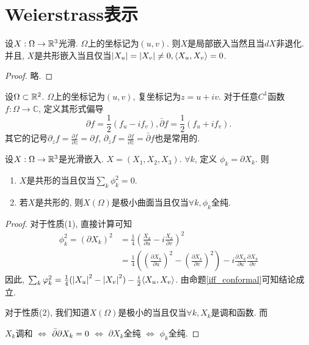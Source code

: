 \section{Weierstrass表示}
\begin{proposition} \label{iff_conformal}
    设$X: \Omega \to \mathbb{R}^3$光滑. $\Omega$上的坐标记为$(u,v)$. 则$X$是局部嵌入当然且当$dX$非退化. 并且, $X$是共形嵌入当且仅当$\left | X_u \right |=\left | X_v \right | \ne 0, {\left < X_u, X_v \right >} =0$.
\end{proposition}
\begin{proof}
    略.
\end{proof}
\begin{definition}
    设$\Omega \subset \mathbb{R}^2$.   $\Omega$上的坐标记为$(u,v)$, 复坐标记为$z=u+iv$. 对于任意$C^1$函数$f: \Omega \to \mathbb{C}$, 定义其形式偏导
    \begin{equation}
        \partial f= \frac{1}{2}(f_u- i f_v), \bar{\partial} f= \frac{1}{2}(f_u+i f_v).
    \end{equation}
    其它的记号$\partial_{z}f=\frac{\partial f}{\partial z} =\partial f$, $\partial_{\bar{z}}f=\frac{\partial f}{\partial \bar{z}} =\bar{\partial} f$也是常用的.
\end{definition}
\begin{proposition} \label{iff_conformal_c}
    设$X: \Omega \to \mathbb{R}^3$是光滑嵌入. $X=(X_1,X_2,X_3)$. $\forall k$, 定义 $\phi_k= \partial X_k$. 则
    \begin{enumerate}
        \item $X$是共形的当且仅当$\sum_k \phi_k^2=0$.
        \item 若$X$是共形的, 则$X(\Omega)$是极小曲面当且仅当$\forall k, \phi_k$全纯.
    \end{enumerate}
\end{proposition}
\begin{proof}
    对于性质(1), 直接计算可知
    \begin{equation}
        \begin{split}
            \phi_k^2=(\partial X_k)^2 &= \frac{1}{4}(\frac{X_k}{\partial u} - i \frac{X_k}{\partial v})^2\\
             &= \frac{1}{4}((\frac{\partial X_k}{\partial u})^2- (\frac{\partial X_k}{\partial v})^2) - i \frac{\partial X_k}{\partial u} \frac{\partial X_k}{\partial v}
        \end{split}
    \end{equation}
    因此,  $\sum_k \varphi_k^2= \frac{1}{4}(\left | X_u \right |^2- \left | X_v \right |^2)-\frac{i}{2} {\left < X_u, X_v \right >}$. 由命题\eqref{iff_conformal}可知结论成立.
    \par 对于性质(2), 我们知道$X(\Omega)$是极小的当且仅当$\forall k, X_k$是调和函数. 而
    \par $X_k$调和 $\iff$ ${\bar{\partial}} \partial X_k=0$ $\iff$ $\partial X_k$全纯 $\iff$ $\phi_k$全纯.
\end{proof}
